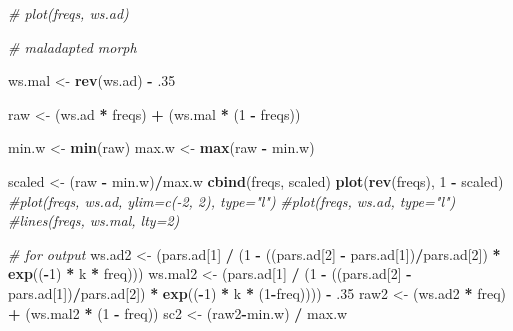 \documentclass[]{article}
\newenvironment{Shaded}{\begin{snugshade}}{\end{snugshade}}
\newcommand{\KeywordTok}[1]{\textcolor[rgb]{0.13,0.29,0.53}{\textbf{#1}}}
\newcommand{\DecValTok}[1]{\textcolor[rgb]{0.00,0.00,0.81}{#1}}
\newcommand{\StringTok}[1]{\textcolor[rgb]{0.31,0.60,0.02}{#1}}
\newcommand{\CommentTok}[1]{\textcolor[rgb]{0.56,0.35,0.01}{\textit{#1}}}
\newcommand{\OperatorTok}[1]{\textcolor[rgb]{0.81,0.36,0.00}{\textbf{#1}}}
\newcommand{\NormalTok}[1]{#1}
\begin{document}
\begin{Shaded}
\begin{Highlighting}[]
  \CommentTok{# plot(freqs, ws.ad)}
  
  \CommentTok{# maladapted morph}
  
\NormalTok{  ws.mal <-}\StringTok{ }\KeywordTok{rev}\NormalTok{(ws.ad) }\OperatorTok{-}\StringTok{ }\NormalTok{.}\DecValTok{35} 
  
\NormalTok{  raw <-}\StringTok{ }\NormalTok{(ws.ad }\OperatorTok{*}\StringTok{ }\NormalTok{freqs) }\OperatorTok{+}\StringTok{ }\NormalTok{(ws.mal }\OperatorTok{*}\StringTok{ }\NormalTok{(}\DecValTok{1} \OperatorTok{-}\StringTok{ }\NormalTok{freqs))}
  
\NormalTok{  min.w <-}\StringTok{ }\KeywordTok{min}\NormalTok{(raw)}
\NormalTok{  max.w <-}\StringTok{ }\KeywordTok{max}\NormalTok{(raw }\OperatorTok{-}\StringTok{ }\NormalTok{min.w)}
  
\NormalTok{  scaled <-}\StringTok{ }\NormalTok{(raw }\OperatorTok{-}\StringTok{ }\NormalTok{min.w)}\OperatorTok{/}\NormalTok{max.w}
  \KeywordTok{cbind}\NormalTok{(freqs, scaled)}
  \KeywordTok{plot}\NormalTok{(}\KeywordTok{rev}\NormalTok{(freqs), }\DecValTok{1} \OperatorTok{-}\StringTok{ }\NormalTok{scaled)}
  \CommentTok{#plot(freqs, ws.ad, ylim=c(-2, 2), type="l")}
  \CommentTok{#plot(freqs, ws.ad, type="l")}
  \CommentTok{#lines(freqs, ws.mal, lty=2)}
  
  \CommentTok{# for output}
\NormalTok{   ws.ad2 <-}\StringTok{ }\NormalTok{(pars.ad[}\DecValTok{1}\NormalTok{] }\OperatorTok{/}\StringTok{ }\NormalTok{(}\DecValTok{1} \OperatorTok{-}\StringTok{ }\NormalTok{((pars.ad[}\DecValTok{2}\NormalTok{] }\OperatorTok{-}\StringTok{ }\NormalTok{pars.ad[}\DecValTok{1}\NormalTok{])}\OperatorTok{/}\NormalTok{pars.ad[}\DecValTok{2}\NormalTok{]) }\OperatorTok{*}\StringTok{ }\KeywordTok{exp}\NormalTok{((}\OperatorTok{-}\DecValTok{1}\NormalTok{) }\OperatorTok{*}\StringTok{ }\NormalTok{k }\OperatorTok{*}\StringTok{ }\NormalTok{freq)))}
\NormalTok{   ws.mal2 <-}\StringTok{ }\NormalTok{(pars.ad[}\DecValTok{1}\NormalTok{] }\OperatorTok{/}\StringTok{ }\NormalTok{(}\DecValTok{1} \OperatorTok{-}\StringTok{ }\NormalTok{((pars.ad[}\DecValTok{2}\NormalTok{] }\OperatorTok{-}\StringTok{ }\NormalTok{pars.ad[}\DecValTok{1}\NormalTok{])}\OperatorTok{/}\NormalTok{pars.ad[}\DecValTok{2}\NormalTok{]) }\OperatorTok{*}\StringTok{ }\KeywordTok{exp}\NormalTok{((}\OperatorTok{-}\DecValTok{1}\NormalTok{) }\OperatorTok{*}\StringTok{ }\NormalTok{k }\OperatorTok{*}\StringTok{ }\NormalTok{(}\DecValTok{1}\OperatorTok{-}\NormalTok{freq)))) }\OperatorTok{-}\StringTok{ }\NormalTok{.}\DecValTok{35}
\NormalTok{   raw2 <-}\StringTok{ }\NormalTok{(ws.ad2 }\OperatorTok{*}\StringTok{ }\NormalTok{freq) }\OperatorTok{+}\StringTok{ }\NormalTok{(ws.mal2 }\OperatorTok{*}\StringTok{ }\NormalTok{(}\DecValTok{1} \OperatorTok{-}\StringTok{ }\NormalTok{freq))}
\NormalTok{   sc2 <-}\StringTok{ }\NormalTok{(raw2}\OperatorTok{-}\NormalTok{min.w) }\OperatorTok{/}\StringTok{ }\NormalTok{max.w}
  

\end{Highlighting}
\end{Shaded}
\end{document}
